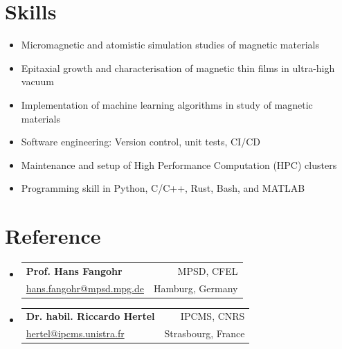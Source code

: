 \documentclass[A4,11pt]{article}
\makeatletter
\newcommand{\CVSubheading}[4]{
  \vspace{-2pt}\item
    \begin{tabular*}{0.97\textwidth}[t]{l@{\extracolsep{\fill}}r}
      \textbf{#1} & #2 \\
      \small#3 & \small #4 \\
    \end{tabular*}\vspace{-7pt}
}
\newcommand{\CVSubHeadingListStart}{\begin{itemize}[leftmargin=0.5cm, label={}]}
\newcommand{\CVSubHeadingListEnd}{\end{itemize}}
\makeatother
\begin{document}

\section{Skills}
\begin{itemize}
  \item Micromagnetic and atomistic simulation studies of magnetic materials
  \item Epitaxial growth and characterisation of magnetic thin films in
    ultra-high vacuum
  \item Implementation of machine learning algorithms in study of magnetic
    materials
  \item Software engineering: Version control, unit tests, CI/CD
  \item Maintenance and setup of High Performance Computation (HPC) clusters
  \item Programming skill in Python, C/C++, Rust, Bash, and MATLAB
\end{itemize}
\section{Reference}
\CVSubHeadingListStart
\CVSubheading
{Prof. Hans Fangohr}{MPSD, CFEL}
{\href{mailto:hans.fangohr@mpsd.mpg.de}{hans.fangohr@mpsd.mpg.de}}{Hamburg, Germany}
\CVSubheading
{Dr. habil. Riccardo Hertel}{IPCMS, CNRS}
{\href{mailto:hertel@ipcms.unistra.fr}{hertel@ipcms.unistra.fr}}{Strasbourg, France}
\CVSubHeadingListEnd
\end{document}
